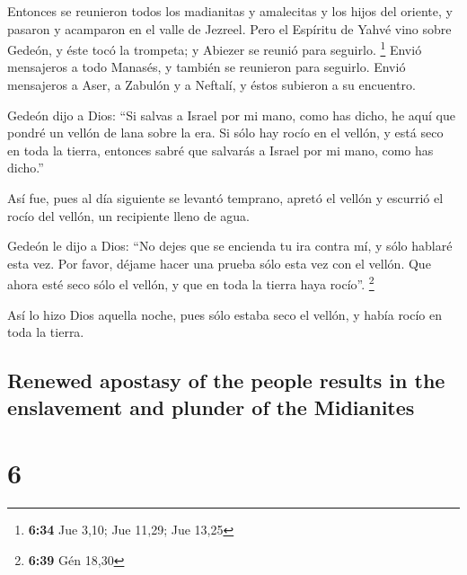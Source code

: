 \begin{paracol}{2}
 Entonces se reunieron todos los madianitas y amalecitas
y los hijos del oriente, y pasaron y acamparon en el valle de Jezreel.
 Pero el Espíritu de Yahvé vino sobre Gedeón, y éste tocó
la trompeta; y Abiezer se reunió para seguirlo. \footnote{\textbf{6:34}
  Jue 3,10; Jue 11,29; Jue 13,25}  Envió mensajeros a
todo Manasés, y también se reunieron para seguirlo. Envió mensajeros a
Aser, a Zabulón y a Neftalí, y éstos subieron a su encuentro.

 Gedeón dijo a Dios: ``Si salvas a Israel por mi mano,
como has dicho,  he aquí que pondré un vellón de lana
sobre la era. Si sólo hay rocío en el vellón, y está seco en toda la
tierra, entonces sabré que salvarás a Israel por mi mano, como has
dicho.''

 Así fue, pues al día siguiente se levantó temprano,
apretó el vellón y escurrió el rocío del vellón, un recipiente lleno de
agua.

 Gedeón le dijo a Dios: ``No dejes que se encienda tu ira
contra mí, y sólo hablaré esta vez. Por favor, déjame hacer una prueba
sólo esta vez con el vellón. Que ahora esté seco sólo el vellón, y que
en toda la tierra haya rocío''. \footnote{\textbf{6:39} Gén 18,30}

 Así lo hizo Dios aquella noche, pues sólo estaba seco el
vellón, y había rocío en toda la tierra.

\switchcolumn
\begin{otherlanguage}{english}

\hypertarget{renewed-apostasy-of-the-people-results-in-the-enslavement-and-plunder-of-the-midianites}{%
\subsection{Renewed apostasy of the people results in the enslavement
and plunder of the
Midianites}\label{renewed-apostasy-of-the-people-results-in-the-enslavement-and-plunder-of-the-midianites}}

\hypertarget{section-11}{%
\section{6}\label{section-11}}


\end{otherlanguage}
\end{paracol}
